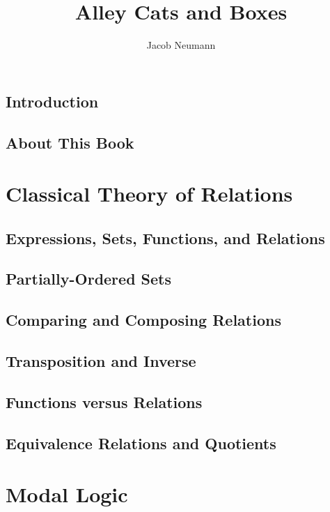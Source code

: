 \documentclass[11pt]{book}
\author{Jacob Neumann}
\title{Alley Cats and Boxes}
\begin{document}
\maketitle

\tableofcontents


\section{Introduction}

\section{About This Book}


\chapter{Classical Theory of Relations}

\section{Expressions, Sets, Functions, and Relations}

\section{Partially-Ordered Sets}

\section{Comparing and Composing Relations}

\section{Transposition and Inverse}

\section{Functions versus Relations}

\section{Equivalence Relations and Quotients}


\chapter{Modal Logic}
\end{document}
